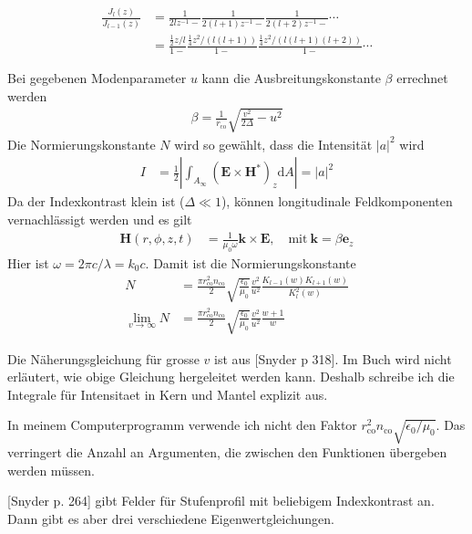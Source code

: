 \documentclass[DIV19,twocolumn]{scrartcl}
\newcommand{\vect}[1]{\mathbf{#1}}
\def\k{\vect k}
\def\e{\vect e}
\def\E{\vect E}
\def\H{\vect H}
\def\({\left(}
\def\){\right)}
\newcommand{\nco}{n_\textrm{co}}
\newcommand{\rco}{r_\textrm{co}}
\begin{document}
\begin{align}
  \frac{J_l(z)}{J_{l-1}(z)} &= \frac{1}{2lz^{-1}-} \frac{1}{2(l+1)z^{-1}-} \frac{1}{2(l+2)z^{-1} -}\cdots \\
  &= \frac{\frac{1}{2}z/l}{1-} \frac{\frac{1}{4}z^2/(l(l+1))}{1-} \frac{\frac{1}{4}z^2/(l(l+1)(l+2))}{1-} \cdots
\end{align}


Bei gegebenen Modenparameter $u$ kann die Ausbreitungskonstante
$\beta$ errechnet werden
\begin{align}
\beta = \frac{1}{\rco} \sqrt{\frac{v^2}{2\Delta} - u^2}
\end{align}
Die Normierungskonstante $N$ wird so gew\"ahlt, dass die Intensit\"at
$|a|^2$ wird
\begin{align}
  I &= \frac{1}{2}\left|\int_{A_\infty}\!\!\!\!\! \(\E\times\H^*\)_z  \textrm{d}A \right| = |a|^2
\end{align}
Da der Indexkontrast klein ist ($\Delta \ll 1$), k\"onnen longitudinale Feldkomponenten vernachl\"assigt werden und es gilt
\begin{align}
  \H(r,\phi,z,t) &= \frac{1}{\mu_0 \omega} \k \times \E, \quad\textrm{mit}\ \k = \beta \e_z
\end{align}
Hier ist $\omega=2\pi c/\lambda=k_0c$.
Damit ist die Normierungskonstante 
\begin{align}
  N &= \frac{\pi \rco^2 \nco}{2} \sqrt{\frac{\epsilon_0}{\mu_0}} \frac{v^2}{u^2} \frac{K_{l-1}(w)K_{l+1}(w)}{K_l^2(w)}\\
  \lim_{v\rightarrow\infty} N &= \frac{\pi \rco^2 \nco}{2} \sqrt{\frac{\epsilon_0}{\mu_0}} \frac{v^2}{u^2} \frac{w+1}{w}
\end{align}

Die N\"aherungsgleichung f\"ur grosse $v$ ist aus [Snyder p 318]. Im
Buch wird nicht erl\"autert, wie obige Gleichung hergeleitet werden
kann. Deshalb schreibe ich die Integrale f\"ur Intensitaet in Kern und
Mantel explizit aus.

In meinem Computerprogramm verwende ich nicht den Faktor $\rco^2 \nco
\sqrt{\epsilon_0/\mu_0}$. Das verringert die Anzahl an Argumenten, die
zwischen den Funktionen \"ubergeben werden m\"ussen.

[Snyder p. 264] gibt Felder f\"ur Stufenprofil mit beliebigem
Indexkontrast an. Dann gibt es aber drei verschiedene
Eigenwertgleichungen.
\end{document}
